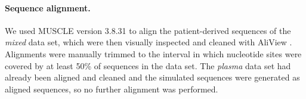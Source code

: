 \documentclass{bmcart}
\begin{document}
\paragraph{Sequence alignment.} \label{subsec:seqalign}
We used MUSCLE version 3.8.31 \cite{Muscle04} to align the patient-derived sequences of the \emph{mixed} data set, which were then visually inspected and cleaned with AliView \cite{AliView14}. 
Alignments were manually trimmed to the interval in which nucleotide sites were covered by at least 50\% of sequences in the data set.
The \emph{plasma} data set had already been aligned and cleaned \cite{McCloskey14} and the simulated sequences were generated as aligned sequences, so no further alignment was performed.

\end{document}
